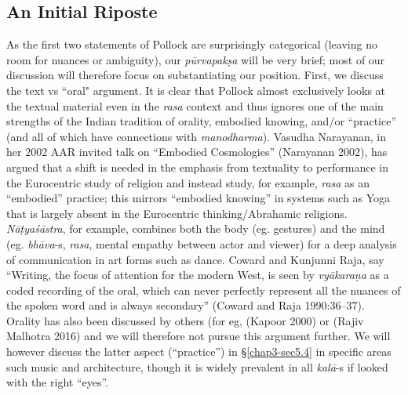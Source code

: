 \subsection{An Initial Riposte}\label{chap3-sec1.1}

As the first two statements of Pollock are surprisingly categorical (leaving no room for nuances or ambiguity), our \textsl{pūrvapakṣa} will be very brief; most of our discussion will therefore focus on substantiating our position. First, we discuss the text vs “oral" argument. It is clear that Pollock almost exclusively looks at the textual material even in the \textsl{rasa} context and thus ignores one of the main strengths of the Indian tradition of orality, embodied knowing, and/or “practice” (and all of which have connections with \textsl{manodharma}). Vasudha Narayanan, in her 2002 AAR invited talk on “Embodied Cosmologies” (Narayanan 2002), has argued that a shift is needed in the emphasis from textuality to performance in the Eurocentric study of religion and instead study, for example, \textsl{rasa} as an “embodied” practice; this mirrors “embodied knowing” in systems such as Yoga that is largely absent in the Eurocentric thinking/Abrahamic religions. \textsl{Nāṭyaśāstra}, for example, combines both the body (eg. gestures) and the mind (eg. \textsl{bhāva}-s, \textsl{rasa}, mental empathy between actor and viewer) for a deep analysis of communication in art forms such as dance. Coward and Kunjunni Raja, say “Writing, the focus of attention for the modern West, is seen by \textsl{vyākaraṇa} as a coded recording of the oral, which can never perfectly represent all the nuances of the spoken word and is always secondary” (Coward and Raja 1990:36--37). Orality has also been discussed by others (for eg, (Kapoor 2000) or (Rajiv Malhotra 2016) and we will therefore not pursue this argument further. We will however discuss the latter aspect (“practice”) in \S\ref{chap3-sec5.4} in specific areas such music and architecture, though it is widely prevalent in all \textsl{kalā}-s if looked with the right “eyes”.

